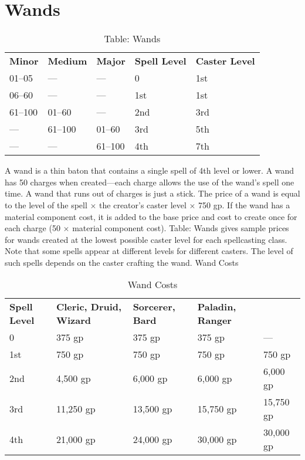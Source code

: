 \section{Wands}

\label{f0}
\begin{table}[]
\sffamily
\caption{Table: Wands}
\begin{tabular}{lllll}
\textbf{Minor} & \textbf{Medium} & \textbf{Major} & \textbf{Spell Level} & \textbf{Caster Level}\\
 01–05 & — & — & 0 & 1st\\
 06–60 & — & — & 1st & 1st\\
 61–100 & 01–60 & — & 2nd & 3rd\\
 — & 61–100 & 01–60 & 3rd & 5th\\
 — & — & 61–100 & 4th & 7th\\
\end{tabular}
\end{table}

				
A wand is a thin baton that contains a single spell of 4th level or lower. A wand has 50 charges when created---each charge allows the use of the wand's spell one time. A wand that runs out of charges is just a stick. The price of a wand is equal to the level of the spell \mbox{$\times$} the creator's caster level \mbox{$\times$} 750 gp. If the wand has a material component cost, it is added to the base price and cost to create once for each charge (50 \mbox{$\times$} material component cost). Table: Wands gives sample prices for wands created at the lowest possible caster level for each spellcasting class. Note that some spells appear at different levels for different casters. The level of such spells depends on the caster crafting the wand.
Wand Costs
\begin{table}
 \sffamily
 \caption{Wand Costs}
 \begin{tabular}{lllll}
\textbf{Spell Level} & \textbf{Cleric, Druid, Wizard} & \textbf{Sorcerer, Bard} & \textbf{Paladin, Ranger}\\
0 & 375 gp & 375 gp & 375 gp & ---\\
1st & 750 gp & 750 gp & 750 gp & 750 gp\\
2nd & 4,500 gp & 6,000 gp & 6,000 gp & 6,000 gp\\
3rd & 11,250 gp & 13,500 gp & 15,750 gp & 15,750 gp\\
4th & 21,000 gp & 24,000 gp & 30,000 gp & 30,000 gp\\  
 \end{tabular}

\end{table}

